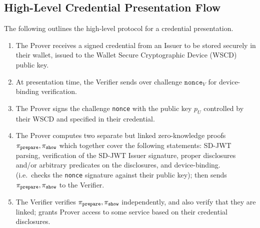 

\subsection{High-Level Credential Presentation Flow}\label{sec:high-level-flow}

The following outlines the high-level protocol for a credential presentation.

\begin{enumerate}
\item The Prover receives a signed credential from an Issuer to be stored securely in their wallet, issued to the Wallet Secure Cryptographic Device (WSCD) public key.
\item At presentation time, the Verifier sends over challenge $\texttt{nonce}_V$ for device-binding verification.
\item The Prover signs the challenge \texttt{nonce} with the public key $p_U$ controlled by their WSCD and specified in their credential.
\item The Prover computes two separate but linked zero-knowledge proofs $\pi_{\text{\texttt{prepare}}}, \pi_{\text{\texttt{show}}}$ which together cover the following statements: SD-JWT parsing, verification of the SD-JWT Issuer signature, 
proper disclosures and/or arbitrary predicates on the disclosures, and device-binding. 
(i.e.\ checks the \texttt{nonce} signature against their public key); then sends $\pi_{\text{\texttt{prepare}}}, \pi_{\text{\texttt{show}}}$ to the Verifier.
\item The Verifier verifies $\pi_{\text{\texttt{prepare}}}, \pi_{\text{\texttt{show}}}$ independently, and also verify that they are linked; grants Prover access to some service based on their credential disclosures.
\end{enumerate}


